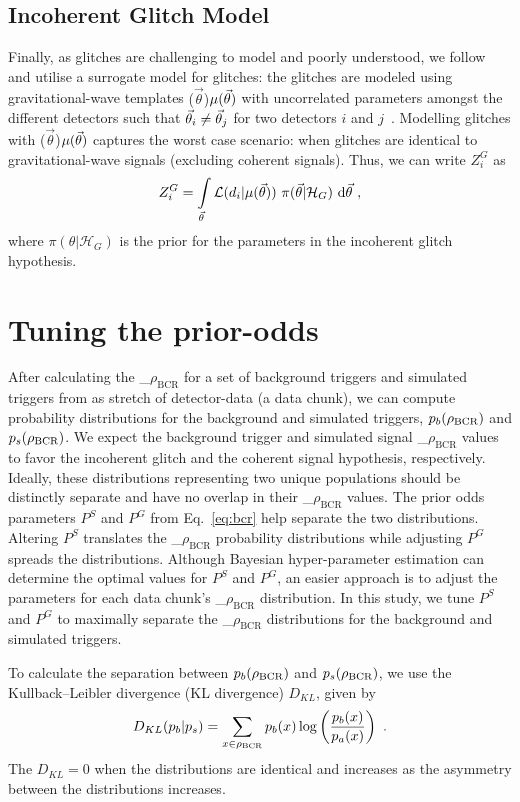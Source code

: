 \documentclass[%
 nofootinbib,
 amsmath,amssymb,
 aps,
 twocolumn,
 superscriptaddress
]{revtex4-2}
\newcommand{\mathcmd}[1]{{\sc \relax\ifmmode#1\else $#1$\fi}\xspace}
\newcommand{\bcr}{\mathcmd{\rho_\text{BCR}}}
\newcommand{\parameters}{\mathcmd{\vec{\theta}}}
\newcommand{\template}{\mathcmd{\mu(\parameters)}}
\begin{document}
\subsection{Incoherent Glitch Model}
Finally, as glitches are challenging to model and poorly understood, we follow \citet{bci} and utilise a surrogate model for glitches: the glitches are modeled using gravitational-wave templates  \template with uncorrelated  parameters amongst the different detectors such that  $\parameters_i \neq \parameters_j$ for two detectors $i$ and $j$~\cite{bci}.  Modelling glitches with \template captures the worst case scenario: when glitches are identical to gravitational-wave signals (excluding coherent signals). Thus, we can write $Z^G_i$ as 
\begin{equation}
\label{eq:zg}
Z^G_i = \int\limits_{\parameters} \mathcal{L}(d_i|\template)\ \pi(\parameters| \mathcal{H}_G)\  \text{d}\parameters  \ ,
\end{equation}
where $\pi(\theta| \mathcal{H}_G)$ is the prior for the parameters in the incoherent glitch hypothesis. 



\section{Tuning the prior-odds}\label{apdx:tuning-prior-odds}

After calculating the \bcr for a set of background triggers and simulated triggers from as stretch of detector-data (a data chunk), we can compute probability distributions for the background and simulated triggers, $p_b(\bcr)$ and $p_s(\bcr)$. We expect the background trigger and simulated signal \bcr values to favor the incoherent glitch and the coherent signal hypothesis, respectively. Ideally, these distributions representing two unique populations should be distinctly separate and have no overlap in their \bcr values. The prior odds parameters $P^S$ and $P^G$ from Eq.~\ref{eq:bcr} help separate the two distributions. Altering $P^S$ translates the \bcr probability distributions while adjusting $P^G$ spreads the distributions. Although Bayesian hyper-parameter estimation can determine the optimal values for $P^S$ and $P^G$, an easier approach is to adjust the parameters for each data chunk's \bcr distribution. In this study, we tune $P^S$ and $P^G$ to maximally separate the \bcr distributions for the background and simulated triggers. 

To calculate the separation between $p_b(\bcr)$ and $p_s(\bcr)$, we use the Kullback--Leibler divergence (KL divergence) $D_{KL}$, given by
\begin{equation}
    D_{KL}(p_b | p_s) = \sum\limits_{x\in \bcr} p_b(x) \log \left( \frac{p_b(x)}{p_a(x)} \right)  \ .
\end{equation}
The $D_{KL}=0$ when the distributions are identical and increases as the asymmetry between the distributions increases. 
\end{document}
